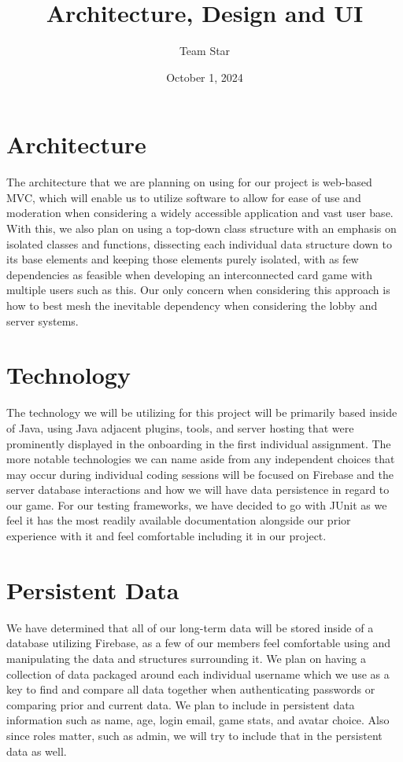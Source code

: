 \documentclass{article}
\title{Architecture, Design and UI}
\author{Team Star}
\date{October 1, 2024}
\begin{document}
\maketitle

\section{Architecture}
The architecture that we are planning on using for our project is web-based MVC, which will enable us to utilize software to allow for ease of use and moderation when considering a widely accessible application and vast user base. With this, we also plan on using a top-down class structure with an emphasis on isolated classes and functions, dissecting each individual data structure down to its base elements and keeping those elements purely isolated, with as few dependencies as feasible when developing an interconnected card game with multiple users such as this. Our only concern when considering this approach is how to best mesh the inevitable dependency when considering the lobby and server systems.

\section{Technology}
The technology we will be utilizing for this project will be primarily based inside of Java, using Java adjacent plugins, tools, and server hosting that were prominently displayed in the onboarding in the first individual assignment. The more notable technologies we can name aside from any independent choices that may occur during individual coding sessions will be focused on Firebase and the server database interactions and how we will have data persistence in regard to our game. For our testing frameworks, we have decided to go with JUnit as we feel it has the most readily available documentation alongside our prior experience with it and feel comfortable including it in our project.

\section{Persistent Data}
We have determined that all of our long-term data will be stored inside of a database utilizing Firebase, as a few of our members feel comfortable using and manipulating the data and structures surrounding it. We plan on having a collection of data packaged around each individual username which we use as a key to find and compare all data together when authenticating passwords or comparing prior and current data. We plan to include in persistent data information such as name, age, login email, game stats, and avatar choice. Also since roles matter, such as admin, we will try to include that in the persistent data as well. 
\end{document}
